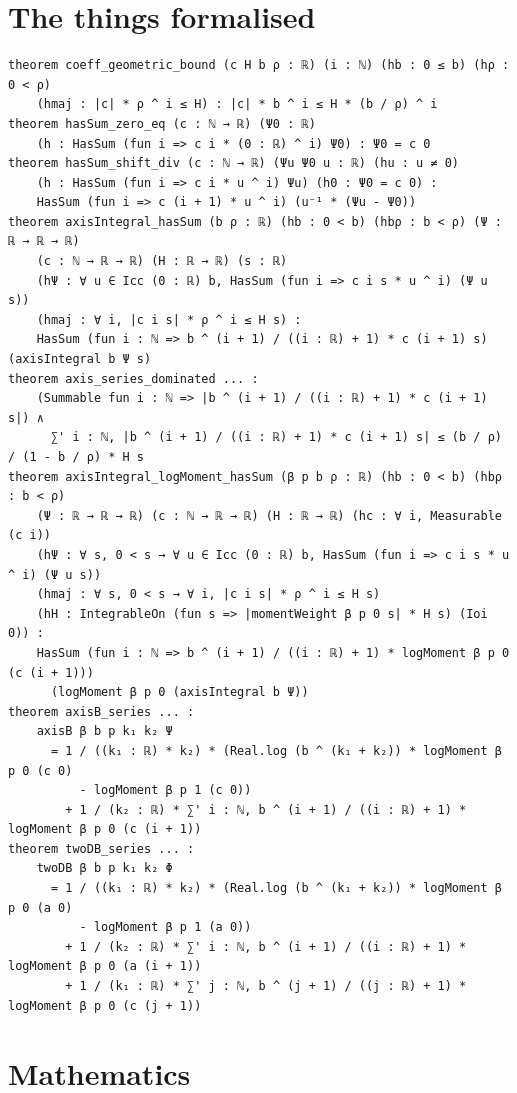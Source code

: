 \documentclass[11pt]{article}
\begin{document}
\section{The things formalised}
{\small
\begin{verbatim}
theorem coeff_geometric_bound (c H b ρ : ℝ) (i : ℕ) (hb : 0 ≤ b) (hρ : 0 < ρ)
    (hmaj : |c| * ρ ^ i ≤ H) : |c| * b ^ i ≤ H * (b / ρ) ^ i
theorem hasSum_zero_eq (c : ℕ → ℝ) (Ψ0 : ℝ)
    (h : HasSum (fun i => c i * (0 : ℝ) ^ i) Ψ0) : Ψ0 = c 0
theorem hasSum_shift_div (c : ℕ → ℝ) (Ψu Ψ0 u : ℝ) (hu : u ≠ 0)
    (h : HasSum (fun i => c i * u ^ i) Ψu) (h0 : Ψ0 = c 0) :
    HasSum (fun i => c (i + 1) * u ^ i) (u⁻¹ * (Ψu - Ψ0))
theorem axisIntegral_hasSum (b ρ : ℝ) (hb : 0 < b) (hbρ : b < ρ) (Ψ : ℝ → ℝ → ℝ)
    (c : ℕ → ℝ → ℝ) (H : ℝ → ℝ) (s : ℝ)
    (hΨ : ∀ u ∈ Icc (0 : ℝ) b, HasSum (fun i => c i s * u ^ i) (Ψ u s))
    (hmaj : ∀ i, |c i s| * ρ ^ i ≤ H s) :
    HasSum (fun i : ℕ => b ^ (i + 1) / ((i : ℝ) + 1) * c (i + 1) s) (axisIntegral b Ψ s)
theorem axis_series_dominated ... :
    (Summable fun i : ℕ => |b ^ (i + 1) / ((i : ℝ) + 1) * c (i + 1) s|) ∧
      ∑' i : ℕ, |b ^ (i + 1) / ((i : ℝ) + 1) * c (i + 1) s| ≤ (b / ρ) / (1 - b / ρ) * H s
theorem axisIntegral_logMoment_hasSum (β p b ρ : ℝ) (hb : 0 < b) (hbρ : b < ρ)
    (Ψ : ℝ → ℝ → ℝ) (c : ℕ → ℝ → ℝ) (H : ℝ → ℝ) (hc : ∀ i, Measurable (c i))
    (hΨ : ∀ s, 0 < s → ∀ u ∈ Icc (0 : ℝ) b, HasSum (fun i => c i s * u ^ i) (Ψ u s))
    (hmaj : ∀ s, 0 < s → ∀ i, |c i s| * ρ ^ i ≤ H s)
    (hH : IntegrableOn (fun s => |momentWeight β p 0 s| * H s) (Ioi 0)) :
    HasSum (fun i : ℕ => b ^ (i + 1) / ((i : ℝ) + 1) * logMoment β p 0 (c (i + 1)))
      (logMoment β p 0 (axisIntegral b Ψ))
theorem axisB_series ... :
    axisB β b p k₁ k₂ Ψ
      = 1 / ((k₁ : ℝ) * k₂) * (Real.log (b ^ (k₁ + k₂)) * logMoment β p 0 (c 0)
          - logMoment β p 1 (c 0))
        + 1 / (k₂ : ℝ) * ∑' i : ℕ, b ^ (i + 1) / ((i : ℝ) + 1) * logMoment β p 0 (c (i + 1))
theorem twoDB_series ... :
    twoDB β b p k₁ k₂ Φ
      = 1 / ((k₁ : ℝ) * k₂) * (Real.log (b ^ (k₁ + k₂)) * logMoment β p 0 (a 0)
          - logMoment β p 1 (a 0))
        + 1 / (k₂ : ℝ) * ∑' i : ℕ, b ^ (i + 1) / ((i : ℝ) + 1) * logMoment β p 0 (a (i + 1))
        + 1 / (k₁ : ℝ) * ∑' j : ℕ, b ^ (j + 1) / ((j : ℝ) + 1) * logMoment β p 0 (c (j + 1))
\end{verbatim}
}

\section{Mathematics}
\end{document}
